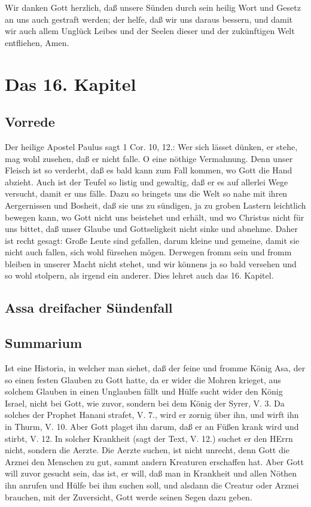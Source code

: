 Wir danken Gott herzlich, daß unsere Sünden durch sein heilig Wort und Gesetz an uns auch gestraft werden; der helfe, daß wir uns daraus bessern, und damit wir auch allem Unglück Leibes und der Seelen dieser und der zukünftigen Welt entfliehen, Amen.

\chapter{Das 16. Kapitel}

\section{Vorrede}

Der heilige Apostel Paulus sagt 1 Cor. 10, 12.: Wer sich lässet dünken, er stehe, mag wohl zusehen, daß er nicht falle. O eine nöthige Vermahnung. Denn unser Fleisch ist so verderbt, daß es bald kann zum Fall kommen, wo Gott die Hand abzieht. Auch ist der Teufel so listig und gewaltig, daß er es auf allerlei Wege versucht, damit er uns fälle. Dazu so bringets uns die Welt so nahe mit ihren Aergernissen und Bosheit, daß sie uns zu sündigen, ja zu groben Lastern leichtlich bewegen kann, wo Gott nicht uns beistehet und erhält, und wo Christus nicht für uns bittet, daß unser Glaube und Gottseligkeit nicht sinke und abnehme. Daher ist recht gesagt: Große Leute sind gefallen, darum kleine und gemeine, damit sie nicht auch fallen, sich wohl fürsehen mögen. Derwegen fromm sein und fromm bleiben in unserer Macht nicht stehet, und wir könnens ja so bald versehen und so wohl stolpern, als irgend ein anderer. Dies lehret auch das 16. Kapitel.

\section[Assa dreifacher Sündenfall]{Assa dreifacher Sündenfall}

\section{Summarium}

Ist eine Historia, in welcher man siehet, daß der feine und fromme König Asa, der so einen festen Glauben zu Gott hatte, da er wider die Mohren krieget, aus solchem Glauben in einen Unglauben fällt und Hülfe sucht wider den König Israel, nicht bei Gott, wie zuvor, sondern bei dem König der Syrer, V. 3. Da solches der Prophet Hanani strafet, V. 7., wird er zornig über ihn, und wirft ihn in Thurm, V. 10. Aber Gott plaget ihn darum, daß er an Füßen krank wird und stirbt, V. 12. In solcher Krankheit (sagt der Text, V. 12.) suchet er den HErrn nicht, sondern die Aerzte. Die Aerzte suchen, ist nicht unrecht, denn Gott die Arznei den Menschen zu gut, sammt andern Kreaturen erschaffen hat. Aber Gott will zuvor gesucht sein, das ist, er will, daß man in Krankheit und allen Nöthen ihn anrufen und Hülfe bei ihm suchen soll, und alsdann die Creatur oder Arznei brauchen, mit der Zuversicht, Gott werde seinen Segen dazu geben.

